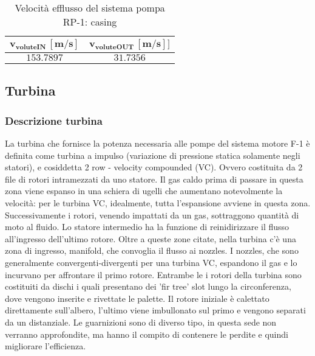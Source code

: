 \begin{table}[H]
\centering
\begin{tabular}{|c|c|}
\hline
$\bm{v_{voluteIN} \, [m/s]}$ & $\bm{v_{voluteOUT} \, [m/s]]}$  \\
\hline
$153.7897$ & $31.7356$   \\
\hline
\end{tabular}

\caption{Velocità efflusso del sistema pompa RP-1: casing}
\label{table:RP-1 pump casing}

\end{table}



\subsection{Turbina}
\label{subsec:turbina}

\subsubsection{Descrizione turbina}


La turbina che fornisce la potenza necessaria alle pompe del sistema motore F-1 è definita come turbina a impulso (variazione di pressione statica solamente negli statori), e cosiddetta 2 row - velocity compounded (VC). Ovvero costituita da 2 file di rotori intramezzati da uno statore. Il gas caldo prima di passare in questa zona viene espanso in una schiera di ugelli che aumentano notevolmente la velocità: per le turbina VC, idealmente, tutta l'espansione avviene in questa zona. Successivamente i rotori, venendo impattati da un gas, sottraggono quantità di moto al fluido. Lo statore intermedio ha la funzione di reinidirizzare il flusso all'ingresso dell'ultimo rotore. Oltre a queste zone citate, nella turbina c'è una zona di ingresso, manifold, che convoglia il flusso ai nozzles. I nozzles, che sono generalmente convergenti-divergenti per una turbina VC, espandono il gas e lo incurvano per affrontare il primo rotore. Entrambe le i rotori della turbina sono costituiti da dischi i quali presentano dei 'fir tree' slot lungo la circonferenza, dove vengono inserite e rivettate le palette. Il rotore iniziale è calettato direttamente sull'albero, l'ultimo viene imbullonato sul primo e vengono separati da un distanziale. Le guarnizioni sono di diverso tipo, in questa sede non verranno approfondite, ma hanno il compito di contenere le perdite e quindi migliorare l'efficienza. 

